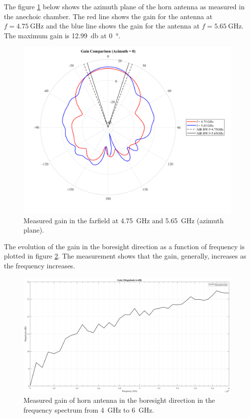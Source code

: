 The figure \ref{fig:horn_azimuth} below shows the azimuth plane of the horn antenna as measured in the anechoic chamber. The red line shows the gain for the antenna at $f=\SI{4.75}{\giga\hertz}$ and the blue line shows the gain for the antenna at $f=\SI{5.65}{\giga\hertz}$. The maximum gain is \SI{12.99}{\decibel} at \SI{0}{\degree}. 
\begin{figure}[H]
    \centering
    \includegraphics[width=1\textwidth]{figures/horn_azimuth.png}
    \caption{Measured gain in the farfield at \SI{4.75}{\giga\hertz} and \SI{5.65}{\giga\hertz} (azimuth plane).} 
    \label{fig:horn_azimuth}
\end{figure}

The evolution of the gain in the boresight direction as a function of frequency is plotted in figure \ref{fig:gain_meas}. The measurement shows that the gain, generally, increases as the frequency increases.
\begin{figure}[H]
    \centering
    \includegraphics[width=1\textwidth]{figures/gain_meas.png}
    \caption{Measured gain of horn antenna in the boresight direction in the frequency spectrum from \SI{4}{\giga\hertz} to \SI{6}{\giga\hertz}.} \label{fig:gain_meas}
\end{figure}

